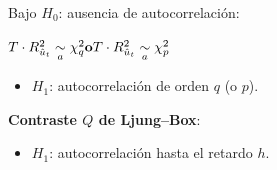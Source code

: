\begin{f}[Detección]
\begin{itemize}[leftmargin=*]
Bajo \(H_{0}\): ausencia de autocorrelación:

\begin{center}
	\(\hfill T\cdot R^{2}_{\hat{u}_t}\underset{a}{\sim}\chi^{2}_{q} \hfill \textbf{o} \hfill T\cdot R^{2}_{\hat{u}_t}\underset{a}{\sim}\chi^{2}_{p} \hfill\)
\end{center}

\begin{itemize}[leftmargin=*]
	\item \(H_{1}\): autocorrelación de orden \(q\) (o \(p\)).
\end{itemize}

\textbf{Contraste \(Q\) de Ljung--Box}:

\begin{itemize}[leftmargin=*]
	\item \(H_{1}\): autocorrelación hasta el retardo \(h\).
\end{itemize}

\end{itemize}


\end{f}  

